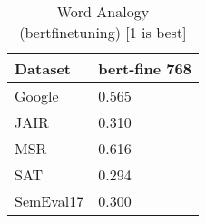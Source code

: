 \begin{table}[]
\centering
\begin{tabular}{l|l}
\hline
Dataset & bert-fine 768 \\
\hline
Google & 0.565 \\ 
JAIR & 0.310 \\ 
MSR & 0.616 \\ 
SAT & 0.294 \\ 
SemEval17 & 0.300
\end{tabular}
\caption{Word Analogy (bertfinetuning) [1 is best]}
\label{tab:analogy-bertfinetuning}
\end{table}
